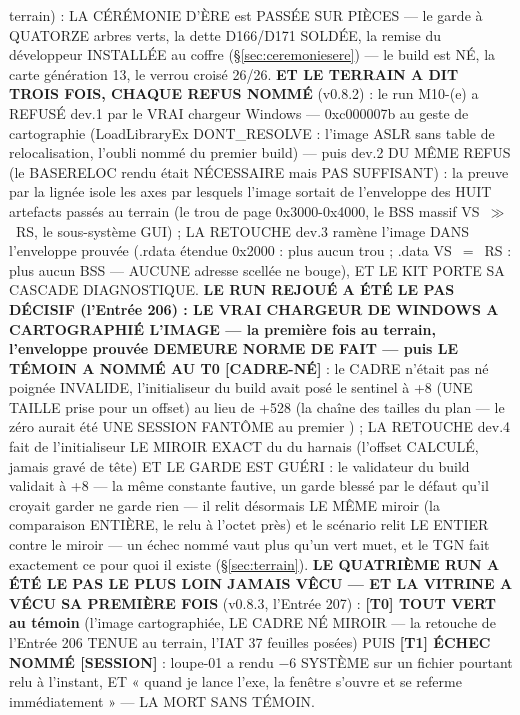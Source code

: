 terrain) : LA CÉRÉMONIE D'ÈRE est PASSÉE SUR PIÈCES — le garde à QUATORZE arbres
verts, la dette D166/D171 SOLDÉE, la remise du développeur INSTALLÉE au coffre
(§\ref{sec:ceremoniesere}) — le build  est NÉ, la carte
génération 13, le verrou croisé 26/26. \textbf{ET LE TERRAIN A DIT TROIS FOIS,
CHAQUE REFUS NOMMÉ} (v0.8.2) : le run M10-(e) a REFUSÉ dev.1 par le VRAI
chargeur Windows — 0xc000007b au geste de cartographie (LoadLibraryEx
DONT\_RESOLVE : l'image ASLR sans table de relocalisation, l'oubli nommé du
premier build) — puis dev.2 DU MÊME REFUS (le BASERELOC rendu était NÉCESSAIRE
mais PAS SUFFISANT) : la preuve par la lignée isole les axes par lesquels
l'image sortait de l'enveloppe des HUIT artefacts passés au terrain (le trou de page
0x3000-0x4000, le BSS massif  VS~$\gg$~RS, le sous-système GUI) ;
LA RETOUCHE dev.3 ramène l'image DANS l'enveloppe prouvée (.rdata étendue 0x2000 :
plus aucun trou ; .data VS~$=$~RS : plus aucun BSS — AUCUNE adresse scellée ne
bouge), ET LE KIT PORTE SA CASCADE DIAGNOSTIQUE. \textbf{LE RUN REJOUÉ A ÉTÉ LE
PAS DÉCISIF (l'Entrée 206) : LE VRAI CHARGEUR DE WINDOWS A CARTOGRAPHIÉ L'IMAGE —
la première fois au terrain, l'enveloppe prouvée DEMEURE NORME DE FAIT — puis LE
TÉMOIN A NOMMÉ AU T0 [CADRE-NÉ]} : le CADRE  n'était pas né poignée
INVALIDE, l'initialiseur du build avait posé le sentinel à +8 (UNE TAILLE
 prise pour un offset) au lieu de +528 (la chaîne des
tailles du plan — le zéro aurait été UNE SESSION FANTÔME au premier ) ;
LA RETOUCHE dev.4 fait de l'initialiseur  LE MIROIR EXACT du
 du harnais (l'offset CALCULÉ, jamais gravé de tête) ET LE
GARDE EST GUÉRI : le validateur du build validait à +8 — la même constante
fautive, un garde blessé par le défaut qu'il croyait garder ne garde rien — il
relit désormais LE MÊME miroir (la comparaison ENTIÈRE, le  relu à
l'octet près) et le scénario relit LE  ENTIER contre le miroir — un
échec nommé vaut plus qu'un vert muet, et le TGN fait exactement ce pour quoi il
existe (§\ref{sec:terrain}). \textbf{LE QUATRIÈME RUN A ÉTÉ LE PAS LE
PLUS LOIN JAMAIS VÊCU — ET LA VITRINE A VÉCU SA PREMIÈRE FOIS} (v0.8.3,
l'Entrée 207) : \textbf{[T0] TOUT VERT au témoin} (l'image cartographiée, LE
CADRE NÉ MIROIR — la retouche de l'Entrée 206 TENUE au terrain, l'IAT 37
feuilles posées) PUIS \textbf{[T1] ÉCHEC NOMMÉ [SESSION]} : loupe-01 a rendu
$-6$ SYSTÈME sur un fichier pourtant relu à l'instant, ET « quand je lance
l'exe, la fenêtre s'ouvre et se referme immédiatement » — LA MORT SANS TÉMOIN.
